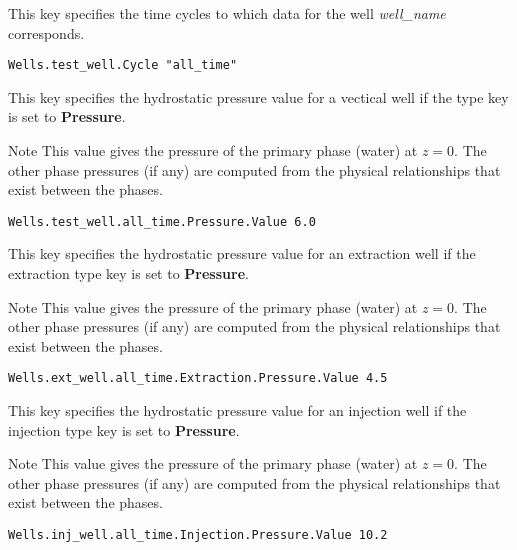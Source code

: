 {
This key specifies the time cycles to which data for the well
{\em well\_name} corresponds. 
}
\begin{display}\begin{verbatim}
Wells.test_well.Cycle "all_time"
\end{verbatim}\end{display}

{
This key specifies the hydrostatic pressure value for a vectical well
if the type key is set to {\bf Pressure}.

Note This value gives the pressure of the primary phase (water) at
$z=0$.  The other phase pressures (if any) are computed from the physical
relationships that exist between the phases.
}
\begin{display}\begin{verbatim}
Wells.test_well.all_time.Pressure.Value 6.0
\end{verbatim}\end{display}

{
This key specifies the hydrostatic pressure value for an extraction well
if the extraction type key is set to {\bf Pressure}.

Note This value gives the pressure of the primary phase (water) at
$z=0$.  The other phase pressures (if any) are computed from the physical
relationships that exist between the phases.
}
\begin{display}\begin{verbatim}
Wells.ext_well.all_time.Extraction.Pressure.Value 4.5
\end{verbatim}\end{display}

{
This key specifies the hydrostatic pressure value for an injection well
if the injection type key is set to {\bf Pressure}.

Note This value gives the pressure of the primary phase (water) at
$z=0$.  The other phase pressures (if any) are computed from the physical
relationships that exist between the phases.
}
\begin{display}\begin{verbatim}
Wells.inj_well.all_time.Injection.Pressure.Value 10.2
\end{verbatim}\end{display}

